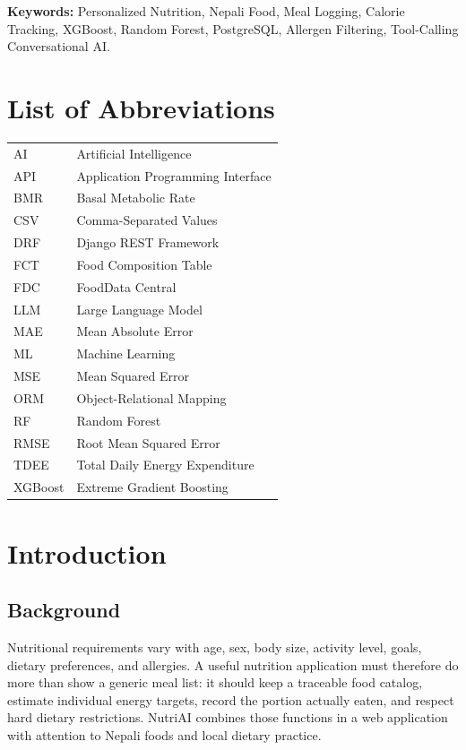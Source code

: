 \documentclass[12pt,a4paper]{report}
\begin{document}
\noindent\textbf{Keywords:} Personalized Nutrition, Nepali Food, Meal Logging,
Calorie Tracking, XGBoost, Random Forest, PostgreSQL, Allergen Filtering,
Tool-Calling Conversational AI.

\tableofcontents
\listoftables
\listoffigures
\chapter*{List of Abbreviations}
\begin{longtable}{ll}
AI & Artificial Intelligence\\
API & Application Programming Interface\\
BMR & Basal Metabolic Rate\\
CSV & Comma-Separated Values\\
DRF & Django REST Framework\\
FCT & Food Composition Table\\
FDC & FoodData Central\\
LLM & Large Language Model\\
MAE & Mean Absolute Error\\
ML & Machine Learning\\
MSE & Mean Squared Error\\
ORM & Object-Relational Mapping\\
RF & Random Forest\\
RMSE & Root Mean Squared Error\\
TDEE & Total Daily Energy Expenditure\\
XGBoost & Extreme Gradient Boosting
\end{longtable}

\clearpage
{}

\chapter{Introduction}
\section{Background}
Nutritional requirements vary with age, sex, body size, activity level, goals, dietary
preferences, and allergies. A useful nutrition application must therefore do more than
show a generic meal list: it should keep a traceable food catalog, estimate individual
energy targets, record the portion actually eaten, and respect hard dietary restrictions.
NutriAI combines those functions in a web application with attention to Nepali foods and
local dietary practice.
\end{document}
